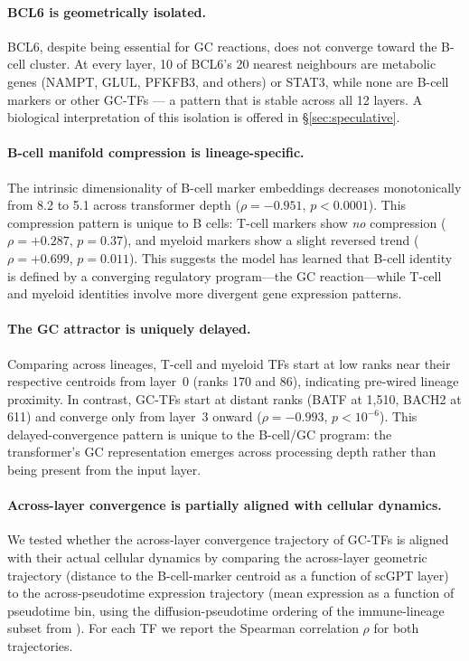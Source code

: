 \documentclass[12pt]{article}
\begin{document}
\paragraph{BCL6 is geometrically isolated.}
BCL6, despite being essential for GC reactions, does not converge toward the B-cell cluster.
At every layer, 10 of BCL6's 20 nearest neighbours are metabolic genes (NAMPT, GLUL, PFKFB3, and others) or STAT3, while none are B-cell markers or other GC-TFs --- a pattern that is stable across all 12 layers.
A biological interpretation of this isolation is offered in §\ref{sec:speculative}.

\paragraph{B-cell manifold compression is lineage-specific.}
The intrinsic dimensionality of B-cell marker embeddings decreases monotonically from 8.2 to 5.1 across transformer depth ($\rho = -0.951$, $p < 0.0001$).
This compression pattern is unique to B cells:
T-cell markers show \emph{no} compression ($\rho = +0.287$, $p = 0.37$), and myeloid markers show a slight reversed trend ($\rho = +0.699$, $p = 0.011$).
This suggests the model has learned that B-cell identity is defined by a converging regulatory program---the GC reaction---while T-cell and myeloid identities involve more divergent gene expression patterns.

\paragraph{The GC attractor is uniquely delayed.}
Comparing across lineages, T-cell and myeloid TFs start at low ranks near their respective centroids from layer~0 (ranks 170 and 86), indicating pre-wired lineage proximity.
In contrast, GC-TFs start at distant ranks (BATF at 1{,}510, BACH2 at 611) and converge only from layer~3 onward ($\rho = -0.993$, $p < 10^{-6}$).
This delayed-convergence pattern is unique to the B-cell/GC program: the transformer's GC representation emerges across processing depth rather than being present from the input layer.

\paragraph{Across-layer convergence is partially aligned with cellular dynamics.}
\label{sec:dynamics_test}
We tested whether the across-layer convergence trajectory of GC-TFs is aligned with their actual cellular dynamics by comparing the across-layer geometric trajectory (distance to the B-cell-marker centroid as a function of scGPT layer) to the across-pseudotime expression trajectory (mean expression as a function of pseudotime bin, using the diffusion-pseudotime ordering of the immune-lineage subset from \cite{kendiukhov2026attention}). For each TF we report the Spearman correlation $\rho$ for both trajectories.
\end{document}

